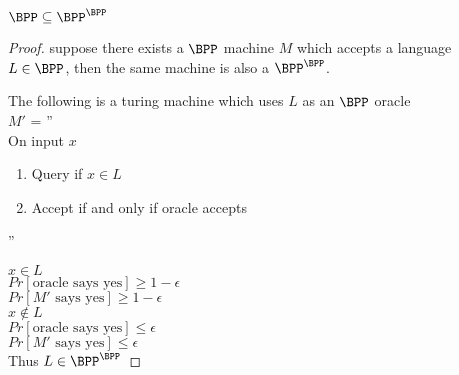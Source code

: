 \begin{claim}\label{bpp_in_oracle_bpp}
    $\BPP \subseteq \BPP^\BPP$
\end{claim}
\begin{proof}
    suppose there exists a $\BPP$ machine $M$ which accepts a language $L \in \BPP$, then the same machine is also a $\BPP^\BPP$.

The following is a turing machine which uses $L$ as an $\BPP$ oracle\\
$M'$ =  ''\\
    On input $x$
    \begin{enumerate}
        \item Query if $x \in L$ 
        \item Accept if and only if oracle accepts
    \end{enumerate}
''

$x \in L$\\
\imp
$Pr[\text{oracle says yes}] \ge 1 - \epsilon$\\
\imp
$Pr[\text{$M'$ says yes}] \ge 1 - \epsilon$\\

$x \notin L$\\
\imp
$Pr[\text{oracle says yes}] \le \epsilon$\\
\imp
$Pr[\text{$M'$ says yes}] \le \epsilon$\\

Thus $L \in \BPP^\BPP$
\end{proof}


